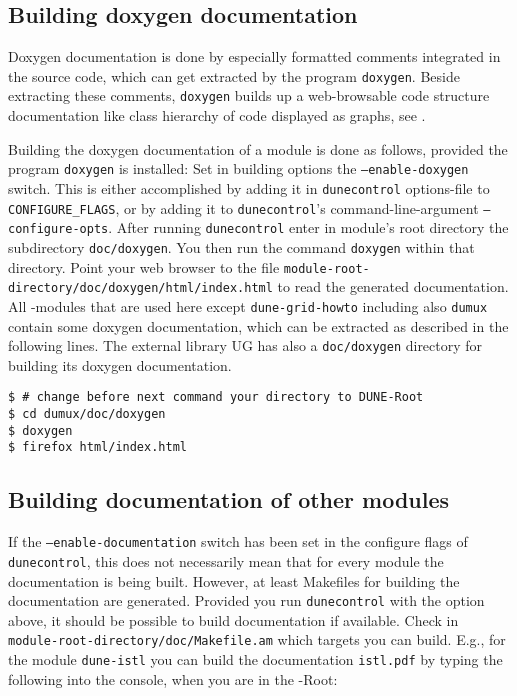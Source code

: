 \subsection{Building doxygen documentation} \label{sec:build-doxy-doc}

Doxygen documentation is done by especially formatted comments integrated in the source code, which can get extracted by the program 
\texttt{doxygen}. Beside extracting these comments, \texttt{doxygen} builds up a web-browsable code structure documentation
like class hierarchy of code displayed as graphs, see \cite{DOXYGEN-HP}.

Building the doxygen documentation of a module is done as follows, provided the program \texttt{doxygen} is installed:
Set in building options the \texttt{--enable-doxygen} switch.
This is either accomplished by adding it in \texttt{dunecontrol} options-file to  \texttt{CONFIGURE\_FLAGS}, or by adding
it to  \texttt{dunecontrol}'s command-line-argument \texttt{--configure-opts}. 
After running \texttt{dunecontrol} enter in module's root directory the subdirectory \texttt{doc/doxygen}.
You then run the command \texttt{doxygen} within that directory. Point your web browser to the file 
\texttt{module-root-directory/doc/doxygen/html/index.html} to read the generated documentation.
All  \Dune-modules that are used here except \texttt{dune-grid-howto}  including also \texttt{dumux} contain some doxygen documentation, which can be extracted as
described in the following lines. The external library UG has also a \texttt{doc/doxygen} directory for building its doxygen documentation.

\begin{lstlisting}[style=Bash]
$ # change before next command your directory to DUNE-Root
$ cd dumux/doc/doxygen
$ doxygen
$ firefox html/index.html
\end{lstlisting}

\subsection{Building documentation of other \Dune modules}

If the \texttt{--enable-documentation} switch has been set in the configure flags of
\texttt{dunecontrol}, this does not necessarily mean that for every 
\Dune module the documentation is being built.
However, at least Makefiles for building the documentation are generated.
Provided you run \texttt{dunecontrol} with the option above,
it should be possible to build documentation if available.
Check in \texttt{module-root-directory/doc/Makefile.am} which targets you can build.
E.g., for the module \texttt{dune-istl} you can build the documentation \texttt{istl.pdf} by typing the following into the console, when you are in the \Dune-Root:

